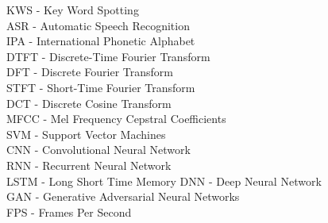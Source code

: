 
KWS - Key Word Spotting\\
ASR - Automatic Speech Recognition\\
IPA - International Phonetic Alphabet\\

DTFT - Discrete-Time Fourier Transform\\
DFT - Discrete Fourier Transform\\
STFT - Short-Time Fourier Transform\\
DCT - Discrete Cosine Transform\\
MFCC - Mel Frequency Cepstral Coefficients\\

SVM - Support Vector Machines\\

CNN - Convolutional Neural Network\\
RNN - Recurrent Neural Network\\
LSTM - Long Short Time Memory
DNN - Deep Neural Network\\
GAN - Generative Adversarial Neural Networks\\

FPS - Frames Per Second\\